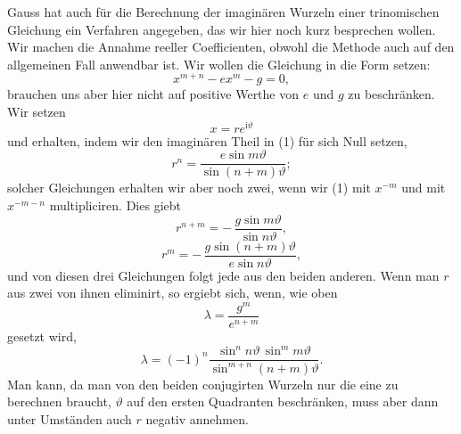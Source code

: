 \documentclass[11pt]{article}
\providecommand{\ii}{\mathrm{i}}
\begin{document}
Gauss hat auch für die Berechnung der imaginären Wurzeln einer trinomischen Gleichung ein Verfahren angegeben, das wir hier noch kurz besprechen wollen. Wir machen die Annahme reeller Coefficienten, obwohl die Methode auch auf den allgemeinen Fall anwendbar ist. Wir wollen die Gleichung in die Form setzen:
\begin{equation}
        x^{m+n}-ex^m-g=0,
\tag{1}
\end{equation}
brauchen uns aber hier nicht auf positive Werthe von $e$ und $g$ zu beschränken. Wir setzen
\[
        x=r e^{\ii\vartheta}
\]
und erhalten, indem wir den imaginären Theil in (1) für sich Null setzen,
\begin{equation}
        r^n=\frac{e\sin m\vartheta}{\sin(n+m)\vartheta};
\tag{2}
\end{equation}
solcher Gleichungen erhalten wir aber noch zwei, wenn wir (1) mit $x^{-m}$ und mit $x^{-m-n}$ multipliciren. Dies giebt
\begin{equation}
        r^{n+m}=-\,\frac{g\sin m\vartheta}{\sin n\vartheta},
\tag{3}
\end{equation}
\begin{equation}
        r^m=-\,\frac{g\sin(n+m)\vartheta}{e\sin n\vartheta},
\tag{4}
\end{equation}
und von diesen drei Gleichungen folgt jede aus den beiden anderen. Wenn man $r$ aus zwei von ihnen eliminirt, so ergiebt sich, wenn, wie oben
\[
        \lambda=\frac{g^m}{e^{n+m}}
\]
gesetzt wird,
\begin{equation}
        \lambda=(-1)^n
        \frac{\sin^n n\vartheta\,\sin^m m\vartheta}
             {\sin^{m+n}(n+m)\vartheta}.
\tag{5}
\end{equation}
Man kann, da man von den beiden conjugirten Wurzeln nur die eine zu berechnen braucht, $\vartheta$ auf den ersten Quadranten beschränken, muss aber dann unter Umständen auch $r$ negativ annehmen.
\end{document}
